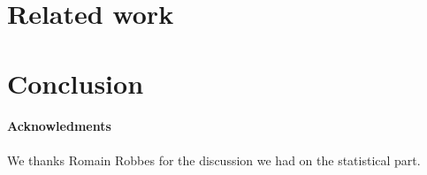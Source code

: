 \documentclass{sig-alternate}
\newcommand{\seclabel}[1]{\label{sec:#1}}
\begin{document}
\section{Related work}\seclabel{relatedwork}



\section{Conclusion}\seclabel{conclusion}

\paragraph{Acknowledments} We thanks Romain Robbes for the discussion we had on the statistical part.





%
\end{document}
